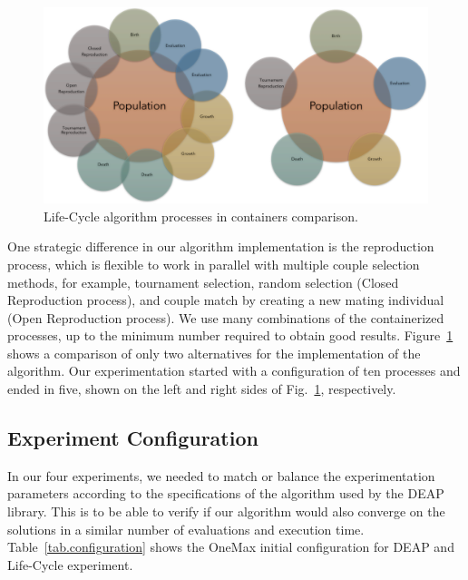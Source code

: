 \documentclass[graybox]{svmult}
\begin{document}
\begin{figure}
    \includegraphics[width=\textwidth]{img/fig5_processes_containers.pdf}
    \caption{Life-Cycle algorithm processes in containers comparison.} \label{fig.processes_containers}
    \end{figure}

One strategic difference in our algorithm implementation is the reproduction
process, which is flexible to work in parallel with multiple couple selection
methods, for example, tournament selection, random selection (Closed
Reproduction process), and couple match by creating a new mating individual
(Open Reproduction process). We use many combinations of the containerized
processes, up to the minimum number required to obtain good results.
Figure~\ref{fig.processes_containers} shows a comparison of only two alternatives for the
implementation of the algorithm. Our experimentation started with a
configuration of ten processes and ended in five, shown on the left and right
sides of Fig.~\ref{fig.processes_containers}, respectively.

\subsection{Experiment Configuration}

In our four experiments, we needed to match or balance the experimentation
parameters according to the specifications of the algorithm used by the DEAP
library. This is to be able to verify if our algorithm would also converge on
the solutions in a similar number of evaluations and execution time.
Table~\ref{tab.configuration} shows the OneMax initial configuration for DEAP and Life-Cycle
experiment.
\end{document}
